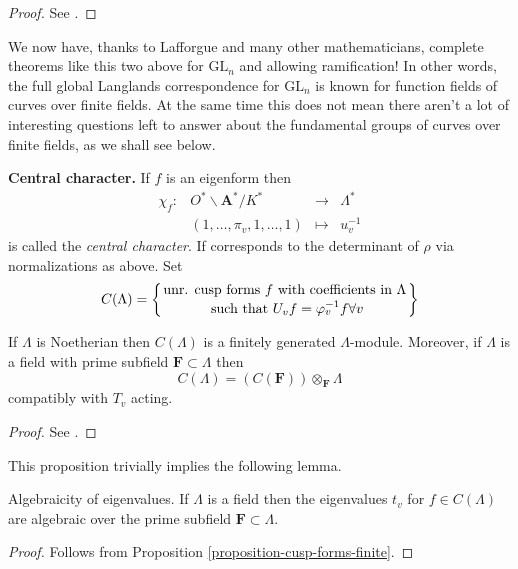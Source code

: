 \begin{proof}
See \cite{D1}.
\end{proof}

\begin{remark}
\label{remark-lafforgue}
We now have, thanks to Lafforgue and many other mathematicians,
complete theorems like this two above for $\text{GL}_n$
and allowing ramification!
In other words, the full global Langlands correspondence for $\text{GL}_n$
is known for function fields of curves over finite fields. At the same
time this does not mean there aren't a lot of interesting questions left
to answer about the fundamental groups of curves over finite fields, as
we shall see below.
\end{remark}

\noindent
{\bf Central character.} If $f$ is an eigenform then
$$
\begin{matrix}
\chi_f : &
O^*\backslash \mathbf{A}^*/K^* &
\to &
\Lambda^* \\
&
(1, \ldots, \pi_v, 1, \ldots, 1) &
\mapsto &
u_v^{-1}
\end{matrix}
$$
is called the {\it central character}. If corresponds to the
determinant of $\rho$ via normalizations as above. Set
$$
C(\Lambda) =
\left\{
{\text{unr. cusp forms } f \text{ with coefficients in }\Lambda}
\atop {\text{ such that } U_v f = \varphi_v^{-1}f\forall v}
\right\}
$$

\begin{proposition}
\label{proposition-cusp-forms-finite}
If $\Lambda$ is Noetherian then $C(\Lambda)$ is a
finitely generated $\Lambda$-module. Moreover, if $\Lambda$ is a field with
prime subfield $\mathbf{F} \subset \Lambda$ then
$$
C(\Lambda)=(C(\mathbf{F}))\otimes_{\mathbf{F}}\Lambda
$$
compatibly with $T_v$ acting.
\end{proposition}

\begin{proof}
See \cite[Proposition 4.7]{dJ-conjecture}.
\end{proof}

\noindent
This proposition trivially implies the following lemma.

\begin{lemma}
\label{lemma-eigenvalues-algebraic}
Algebraicity of eigenvalues.
If $\Lambda$ is a field then the eigenvalues $t_v$ for $f\in
C(\Lambda)$ are algebraic over the prime subfield
$\mathbf{F} \subset \Lambda$.
\end{lemma}

\begin{proof}
Follows from Proposition \ref{proposition-cusp-forms-finite}.
\end{proof}

